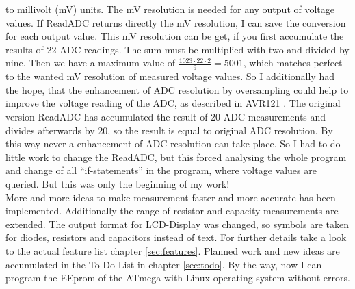 to millivolt (mV) units. The mV resolution is needed for any output of voltage values.
If ReadADC returns directly the mV resolution, I can save the conversion for each output value.
This mV resolution can be get, if you first accumulate the results of 22 ADC readings.
 The sum must be multiplied with two and divided by nine. Then we have a maximum value of \begin{math}\frac{1023\cdot22\cdot2}{9} = 5001\end{math},
which matches perfect to the wanted mV resolution of measured voltage values.
So I additionally had the hope, that the enhancement of ADC resolution by oversampling could help to improve the
voltage reading of the ADC, as described in AVR121 \cite{AVR121}.
The original version ReadADC has accumulated the result of 20 ADC measurements and divides afterwards by 20, 
so the result is equal to original ADC resolution. By this way never a enhancement of ADC resolution can take place.
So I had to do little work to change the ReadADC, but this forced analysing the whole program and change
of all ``if-statements'' in the program, where voltage values are queried.
But this was only the beginning of my work!\\

More and more ideas to make measurement faster and more accurate has been implemented.
Additionally the range of resistor and capacity measurements are extended.
The output format for LCD-Display was changed, so symbols are taken for diodes, resistors and capacitors instead of text.
For further details take a look to the actual feature list chapter \ref{sec:features}.
Planned work and new ideas are accumulated in the To Do List in chapter \ref{sec:todo}.
By the way, now I can program the EEprom of the ATmega with Linux operating system without errors.

